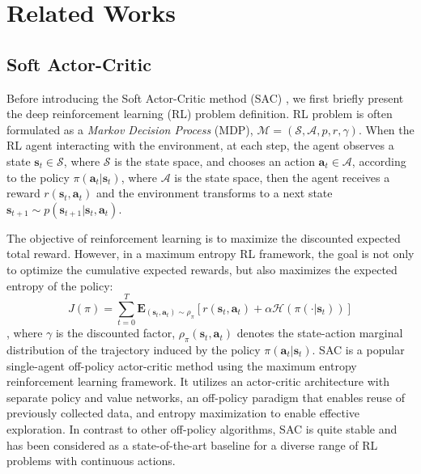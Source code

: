 \documentclass[runningheads]{llncs}
\begin{document}
\section{Related Works}\label{related work}
\subsection{Soft Actor-Critic}
Before introducing the Soft Actor-Critic method (SAC) \cite{b11}, we first briefly present the deep reinforcement learning (RL) problem definition. RL problem is often formulated as a {\em Markov Decision Process} (MDP), $\mathcal{M}=\left(\mathcal{S}, \mathcal{A}, p, r, \gamma\right)$. When the RL agent interacting with the environment, at each step, the agent observes a state ${\mathbf{s}_{t} \in \mathcal{S}}$, where $\mathcal{S}$ is the state space, and chooses an action ${\mathbf{a}_{t}\in\mathcal{A}}$, according to the policy $\pi(\mathbf{a}_{t}|\mathbf{s}_{t})$, where $\mathcal{A}$ is the state space, then the agent receives a reward $r\left(\mathbf{s}_{t}, \mathbf{a}_{t}\right)$ and the environment transforms to a next state $\mathbf{s}_{t+1}\sim p(\mathbf{s}_{t+1}|\mathbf{s}_{t},\mathbf{a}_{t})$. 


The objective of reinforcement learning is to maximize the discounted expected total reward. However, in a maximum entropy RL framework, the goal is not only  to optimize the cumulative expected rewards, but also maximizes the expected entropy of the policy:
\begin{equation}
	J(\pi)=\sum_{t=0}^{T} \mathbf{E}_{\left(\mathbf{s}_{t}, \mathbf{a}_{t}\right) \sim \rho_{\pi}}\left[r\left(\mathbf{s}_{t}, \mathbf{a}_{t}\right)+\alpha \mathcal{H}\left(\pi\left(\cdot | \mathbf{s}_{t}\right)\right)\right]
\end{equation}
, where $\gamma $ is the discounted factor, $\rho_{\pi}\left(\mathbf{s}_{t},\mathbf{a}_{t}\right)$ denotes 
the state-action marginal distribution of the trajectory
induced by the policy $\pi(\mathbf{a}_{t}|\mathbf{s}_{t})$.
SAC is a popular single-agent off-policy actor-critic method
using the maximum entropy reinforcement learning framework. It utilizes an actor-critic architecture with separate policy and value networks, an off-policy paradigm that enables reuse of previously collected data, and entropy maximization to enable effective exploration. In contrast to other off-policy algorithms, SAC is quite stable and has been considered as a state-of-the-art baseline for a diverse range of RL problems with continuous actions.
\end{document}
